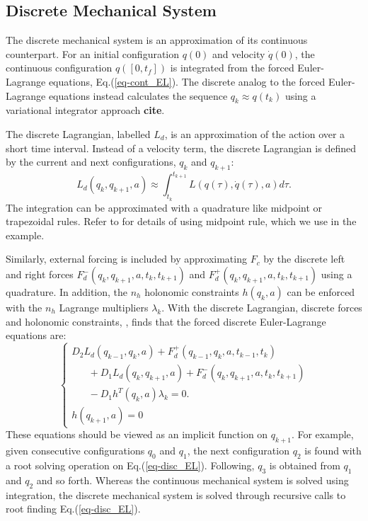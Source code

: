 \documentclass[letterpaper, 10pt, conference]{ieeeconf}
\begin{document}
\subsection{Discrete Mechanical System}
The discrete mechanical system is an approximation of its continuous counterpart.  For an initial configuration $q(0)$ and velocity $\dot{q}(0)$, the continuous configuration $q([0,t_f])$ is integrated from the forced Euler-Lagrange equations, Eq.(\ref{eq-cont_EL}).  The discrete analog to the forced Euler-Lagrange equations instead calculates the sequence $q_k\approx q(t_k)$ using a variational integrator approach \textbf{cite}.  

The discrete Lagrangian, labelled $L_d$, is an approximation of the action over a short time interval.  Instead of a velocity term, the discrete Lagrangian is defined by the current and next configurations, $q_k$ and $q_{k+1}$:
\begin{equation}
L_d(q_k,q_{k+1},a) \approx \int_{t_k}^{t_{k+1}}L(q(\tau),\dot{q}(\tau),a)d\tau.
\label{eq-Ld}
\end{equation}
The integration can be approximated with a quadrature like midpoint or trapezoidal rules.  Refer to \cite{johnson_murphey_scalable} for details of using midpoint rule, which we use in the example.  

Similarly, external forcing is included by approximating $F_c$ by the discrete left and right forces $F_d^-(q_k,q_{k+1},a,t_k,t_{k+1})$ and $F_d^+(q_k,q_{k+1},a,t_k,t_{k+1})$ using a quadrature.  In addition, the $n_h$ holonomic constraints $h(q_k,a)$ can be enforced with the $n_h$ Lagrange multipliers $\lambda_k$.  With the discrete Lagrangian, discrete forces and holonomic constraints, \cite{johnson_murphey_scalable}, finds that the forced discrete Euler-Lagrange equations are:
\begin{equation}
\left\{\begin{array}{l}
D_2 L_d(q_{k-1},q_{k},a) + F_d^+(q_{k-1},q_{k},a,t_{k-1},t_{k}) \\\hspace{20pt}+ D_1L_d(q_k,q_{k+1},a) + F_d^-(q_k,q_{k+1},a,t_k,t_{k+1}) \\\hspace{20pt} - D_1h^T(q_k,a)\lambda_k= 0. \\
\hspace{0pt}h(q_{k+1},a) = 0
\end{array}
\right.
\label{eq-disc_EL}
\end{equation}
These equations should be viewed as an implicit function on $q_{k+1}$.  For example, given consecutive configurations $q_0$ and $q_1$, the next configuration $q_2$ is found with a root solving operation on Eq.(\ref{eq-disc_EL}). Following, $q_3$ is obtained from $q_1$ and $q_2$ and so forth.  Whereas the continuous mechanical system is solved using integration, the discrete mechanical system is solved through recursive calls to root finding Eq.(\ref{eq-disc_EL}). 
\end{document}
